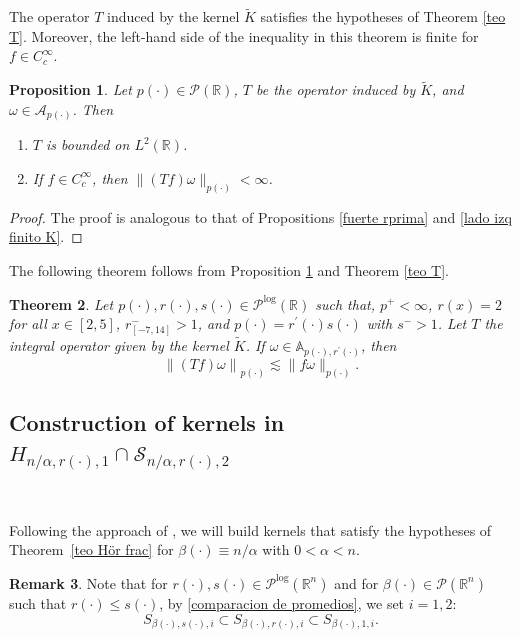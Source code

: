 \documentclass[a4paper,11pt,reqno]{amsart}
\theoremstyle{plain}
\numberwithin{equation}{section}
\newtheorem{teo}{Theorem}[section]
\newtheorem{propo}[teo]{Proposition}
\theoremstyle{definition}
\newtheorem{remark}[teo]{Remark}
\newcommand{\R}{{\mathbb{R}^n}}
\begin{document}
The operator $T$ induced by the kernel $\tilde{K}$ satisfies the hypotheses of Theorem \ref{teo T}. Moreover, the left-hand side of the inequality in this theorem is finite for $f\in C_c^\infty$.

\begin{propo}\label{lado izq finito K tilde}
	Let $p(\cdot)\in \mathcal{P}(\mathbb{R})$, $T$ be the operator induced by $\tilde{K}$, and $\omega\in \mathcal{A}_{p(\cdot)}$. Then
	\begin{enumerate}
		\item $T$ is bounded on $L^2(\mathbb{R})$.
		\item If $f\in C^\infty_c$, then $\|(Tf)\omega\|_{p(\cdot)}<\infty$.
	\end{enumerate}

\end{propo}
\begin{proof}
	The proof is analogous to that of Propositions \ref{fuerte rprima} and \ref{lado izq finito K}.
\end{proof}
The following theorem follows from Proposition \ref{lado izq finito K tilde} and Theorem \ref{teo T}.
\begin{teo}
	Let ${p(\cdot)},{r(\cdot)},s(\cdot)\in\mathcal{P}^{\log}(\mathbb{R})$ such that, $p^+<\infty$, $r(x)=2$ for all $x\in[2,5]$, $r^-_{[-7,14]}>1$, and ${p(\cdot)}={r^\prime(\cdot)}{s(\cdot)}$ with $s^->1$. Let $T$ the integral operator given by the kernel $\tilde{K}$. If $\omega\in \mathbb{A}_{{p(\cdot)},{r^\prime(\cdot)}}$, then  
	$$\left\|(T f)\omega\right\|_{p(\cdot)}\lesssim \|f\omega\|_{p(\cdot)}.$$
	
\end{teo}


\subsection{Construction of kernels in $H_{n/\alpha,r(\cdot),1}\cap \mathcal{S}_{n/\alpha,r(\cdot),2}$}

\

Following the approach of \cite{S_A}, we will build kernels that satisfy the hypotheses of Theorem~\ref{teo Hör frac} for ${\beta(\cdot)}\equiv n/\alpha$ with $0<\alpha<n$.
\begin{remark}
	

	Note that for ${r(\cdot)},{s(\cdot)}\in\mathcal{P}^{\text{log}}(\R)$ and for ${\beta(\cdot)}\in \mathcal{P}(\R)$ such that  ${r(\cdot)}\leq{s(\cdot)}$, by \eqref{comparacion de promedios}, we set $i=1,2$:
	\begin{equation}\label{contencion de S}
			S_{\beta(\cdot),s(\cdot),i}\subset S_{\beta(\cdot),r(\cdot),i}\subset S_{\beta(\cdot),1,i}.
	\end{equation}
\end{remark}	
\end{document}

